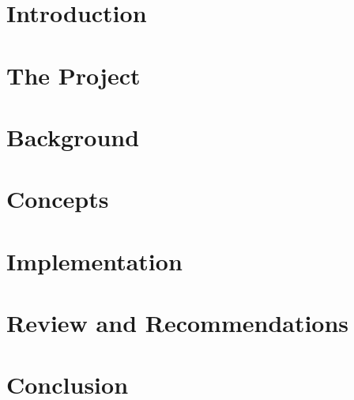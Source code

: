 \documentclass[11pt]{report}
\begin{document}
  
  
  
  
  
  \tableofcontents
  
  \chapter{Introduction}
  \label{cha:intro}
  
    
  
  \chapter{The Project}
  \label{cha:background}
  
    
  
  \chapter{Background}
  \label{cha:concBack}
    
    
  
  \chapter{Concepts}
  \label{cha:concepts}
  
    
  
  \chapter{Implementation}
  \label{cha:impl}
  
    
  
  \chapter{Review and Recommendations}
  \label{cha:review}
    
    
    
  \chapter{Conclusion}
  \label{cha:conc}
  
    
  
\end{document}
